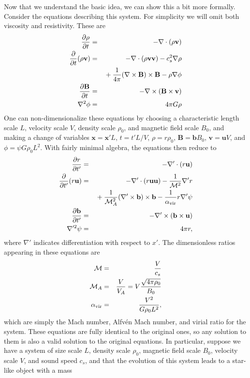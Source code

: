 Now that we understand the basic idea, we can show this a bit more formally. Consider the equations describing this system. For simplicity we will omit both viscosity and resistivity. These are
\begin{eqnarray}
\frac{\partial \rho}{\partial t} & = & -\nabla \cdot (\rho \mathbf{v}) \\
\frac{\partial}{\partial t}(\rho \mathbf{v}) & = & -\nabla \cdot (\rho\mathbf{v}\mathbf{v}) - c_s^2 \nabla \rho
\nonumber \\
& & {} + \frac{1}{4\pi} (\nabla \times \mathbf{B}) \times \mathbf{B} - \rho \nabla \phi \\
\frac{\partial\mathbf{B}}{\partial t} & = & -\nabla \times (\mathbf{B}\times\mathbf{v}) \\
\nabla^2 \phi & = & 4\pi G \rho
\end{eqnarray}
One can non-dimensionalize these equations by choosing a characteristic length scale $L$, velocity scale $V$, density scale $\rho_0$, and magnetic field scale $B_0$, and making a change of variables $\mathbf{x} = \mathbf{x}'L$, $t = t' L/V$, $\rho = r \rho_0$, $\mathbf{B} = \mathbf{b} B_0$, $\mathbf{v} = \mathbf{u} V$, and $\phi = \psi G\rho_0 L^2$. With fairly minimal algebra, the equations then reduce to
\begin{eqnarray}
\frac{\partial r}{\partial t'} & = & -\nabla'\cdot (r\mathbf{u}) \\
\frac{\partial}{\partial t'}(r \mathbf{u}) & = & -\nabla' \cdot \left(r\mathbf{uu}\right) - \frac{1}{\mathcal{M}^2}\nabla' r \nonumber \\
& & {} + \frac{1}{\mathcal{M}_A^2} (\nabla'\times\mathbf{b})\times\mathbf{b} - \frac{1}{\alpha_{\rm vir}} r \nabla' \psi \\
\frac{\partial\mathbf{b}}{\partial t'} & = & -\nabla'\times\left(\mathbf{b}\times\mathbf{u}\right) \\
\nabla'^2 \psi & = & 4\pi r,
\end{eqnarray}
where $\nabla'$ indicates differentiation with respect to $x'$. The dimensionless ratios appearing in these equations are
\begin{eqnarray}
\mathcal{M} & = & \frac{V}{c_s} \\
\mathcal{M}_A & = & \frac{V}{V_A} = V\frac{\sqrt{4\pi \rho_0}}{B_0} \\
\alpha_{\rm vir} & = & \frac{V^2}{G \rho_0 L^2},
\end{eqnarray}
which are simply the Mach number, Alfv\'{e}n Mach number, and virial ratio for the system. These equations are fully identical to the original ones, so any solution to them is also a valid solution to the original equations. In particular, suppose we have a system of size scale $L$, density scale $\rho_0$, magnetic field scale $B_0$, velocity scale $V$, and sound speed $c_s$, and that the evolution of this system leads to a star-like object with a mass
